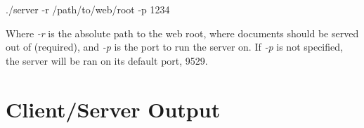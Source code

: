 \documentclass[12pt]{article}
\begin{document}
./server -r /path/to/web/root -p 1234

Where \emph{-r} is the absolute path to the web root, where documents should be served out of (required), and \emph{-p} is the port to run the server on. If \emph{-p} is not specified, the server will be ran on its default port, 9529.

\section{Client/Server Output}
\end{document}
